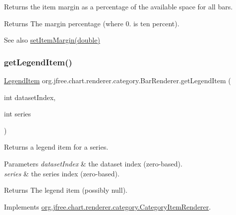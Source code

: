 Returns the item margin as a percentage of the available space for all bars.

\begin{DoxyReturn}{Returns}
The margin percentage (where 0. is ten percent).
\end{DoxyReturn}
\begin{DoxySeeAlso}{See also}
\mbox{\hyperlink{classorg_1_1jfree_1_1chart_1_1renderer_1_1category_1_1_bar_renderer_aa1a02fa837f9a309c0cc4f94683d4104}{set\+Item\+Margin(double)}} 
\end{DoxySeeAlso}
\mbox{\label{classorg_1_1jfree_1_1chart_1_1renderer_1_1category_1_1_bar_renderer_a30254dc9cccaf5d15872a760965f7a9d}} 
\subsubsection{\texorpdfstring{get\+Legend\+Item()}{getLegendItem()}}
{\footnotesize\ttfamily \mbox{\hyperlink{classorg_1_1jfree_1_1chart_1_1_legend_item}{Legend\+Item}} org.\+jfree.\+chart.\+renderer.\+category.\+Bar\+Renderer.\+get\+Legend\+Item (\begin{DoxyParamCaption}\item[{int}]{dataset\+Index,  }\item[{int}]{series }\end{DoxyParamCaption})}

Returns a legend item for a series.


\begin{DoxyParams}{Parameters}
{\em dataset\+Index} & the dataset index (zero-\/based). \\
\hline
{\em series} & the series index (zero-\/based).\\
\hline
\end{DoxyParams}
\begin{DoxyReturn}{Returns}
The legend item (possibly {\ttfamily null}). 
\end{DoxyReturn}


Implements \mbox{\hyperlink{interfaceorg_1_1jfree_1_1chart_1_1renderer_1_1category_1_1_category_item_renderer_ab9269f34c8b4859211e4f4472636c93c}{org.\+jfree.\+chart.\+renderer.\+category.\+Category\+Item\+Renderer}}.

